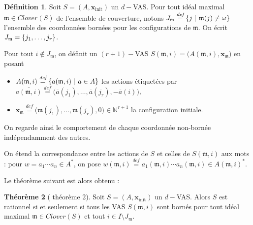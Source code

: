 \documentclass[a4paper,final]{article}
\theoremstyle{definition}
\newtheorem{Theorem}{Théorème}
\newtheorem{Definition}[Theorem]{Définition}
\newcommand{\set}[2]{\left\{#1\mathrel{\left|\vphantom{#1}\vphantom{#2}\right.}#2\right\}}
\newcommand{\os}[1]{\left\{\mathinner{#1}\right\}}
\newcommand{\defeq}{\ensuremath{\stackrel{\textit{def}}{=}}}
\newcommand{\N}{\ensuremath{\mathbb{N}}}
\newcommand{\clover}{\textit{Clover}}
\newcommand{\vect}[1]{\ensuremath{\mathbf{#1}}}
\newcommand{\xinit}{\ensuremath{\vect{x}_\text{init}}}
\newcommand{\valeur}[1]{\ensuremath{\overline{#1}}}
\begin{document}
\begin{Definition}
Soit $S=(A,\xinit)$ un $d-$VAS.
Pour tout idéal maximal $\mathfrak{m}\in\clover(S)$ de l'ensemble de couverture, notons $J_\mathfrak{m} \defeq \set{j}{\mathfrak{m}(j)\neq \omega}$ l'ensemble des coordonnées bornées pour les configurations de $\mathfrak{m}$.
On écrit $J_\mathfrak{m}=\os{j_1,\dots,j_r}$.

Pour tout $i\notin J_\mathfrak{m}$, on définit un $(r+1)-$VAS $S(\mathfrak{m},i) = \big(A(\mathfrak{m},i), \vect{x}_\mathfrak{m}\big)$ en posant
\begin{itemize}
    \item $A(\mathfrak{m},i) \defeq \set{a(\mathfrak{m},i)} {a\in A}$ 
    les actions étiquetées par $\valeur{a(\mathfrak{m},i)} \defeq \big(\valeur{a}(j_1), \dots, \valeur{a}(j_r), -\valeur{a}(i) \big)$,
    \item $\vect{x}_\mathfrak{m} \defeq \big(\mathfrak{m}(j_1), \dots, \mathfrak{m}(j_r), 0\big) \in \N^{r+1}$ la configuration initiale.
\end{itemize}
\end{Definition}

\noindent On regarde ainsi le comportement de chaque coordonnée non-bornée indépendamment des autres.

On étend la correspondance entre les actions de $S$ et celles de $S(\mathfrak{m},i)$ aux mots : 
pour $w = a_1\cdots a_n \in A^\ast$, on pose $w(\mathfrak{m},i) \defeq a_1(\mathfrak{m},i) \cdots a_n(\mathfrak{m},i) \in A(\mathfrak{m},i)^\ast$.

Le théorème suivant est alors obtenu :

\begin{Theorem}[\cite{giyo80} théorème 2]
    Soit $S=(A,\xinit)$ un $d-$VAS.
    Alors $S$ est rationnel si et seulement si 
    tous les VAS $S(\mathfrak{m},i)$ sont bornés pour tout idéal maximal $\mathfrak{m} \in \clover(S)$ et tout $i \in I \setminus J_\mathfrak{m}$.
\end{Theorem}
\end{document}
